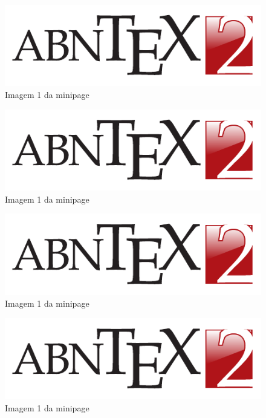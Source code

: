 \begin{figure}[htbp]
    \centering
    \caption{Imagem 1 da minipage} \label{2}
    \includegraphics[scale=0.9]{figs/abntex2-modelo-img-marca.pdf}
\end{figure}

\begin{figure}[htbp]
    \centering
    \caption{Imagem 1 da minipage} \label{3}
    \includegraphics[scale=0.9]{figs/abntex2-modelo-img-marca.pdf}
\end{figure}

\begin{figure}[htbp]
    \centering
    \caption{Imagem 1 da minipage} \label{4}
    \includegraphics[scale=0.9]{figs/abntex2-modelo-img-marca.pdf}
\end{figure}

\begin{figure}[htbp]
    \centering
    \caption{Imagem 1 da minipage} \label{5}
    \includegraphics[scale=0.9]{figs/abntex2-modelo-img-marca.pdf}
\end{figure}

